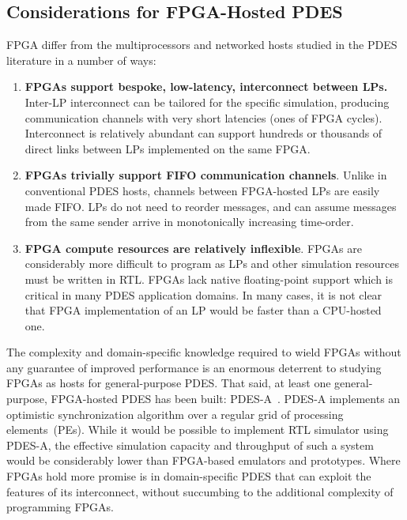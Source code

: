 

\subsection{Considerations for FPGA-Hosted PDES}

FPGA differ from the multiprocessors and networked hosts studied in the PDES literature in a number of ways:

\begin{enumerate}
\item \textbf{FPGAs support bespoke, low-latency, interconnect between LPs.} Inter-LP
interconnect can be tailored for the specific simulation, producing
communication channels with very short latencies (ones of FPGA cycles).
Interconnect is relatively abundant can support hundreds or thousands
of direct links between LPs implemented on the same FPGA.

\item \textbf{FPGAs trivially support FIFO communication channels}. Unlike in
conventional PDES hosts, channels between FPGA-hosted LPs are easily made FIFO.
LPs do not need to reorder messages, and
can assume messages from the same sender arrive in monotonically increasing
time-order.


\item \textbf{FPGA compute resources are relatively inflexible}. FPGAs are considerably more difficult to
program as LPs and other simulation resources must be written in RTL. FPGAs lack native floating-point support which is
critical in many PDES application domains. In many cases, it is not clear that
FPGA implementation of an LP would be faster than a CPU-hosted one.
\end{enumerate}

The complexity and domain-specific knowledge required to wield FPGAs without
any guarantee of improved performance is an enormous deterrent to studying FPGAs
as hosts for general-purpose PDES. That said, at least one general-purpose, FPGA-hosted
PDES has been built: PDES-A~\cite{PDESA}. PDES-A implements an optimistic
synchronization algorithm over a regular grid of processing elements~(PEs).  While it would be
possible to implement RTL simulator using PDES-A, the effective simulation
capacity and throughput of such a system would be considerably lower than
FPGA-based emulators and prototypes. Where FPGAs hold more promise is in domain-specific PDES that
can exploit the features of its interconnect, without succumbing to the additional complexity of programming FPGAs.

